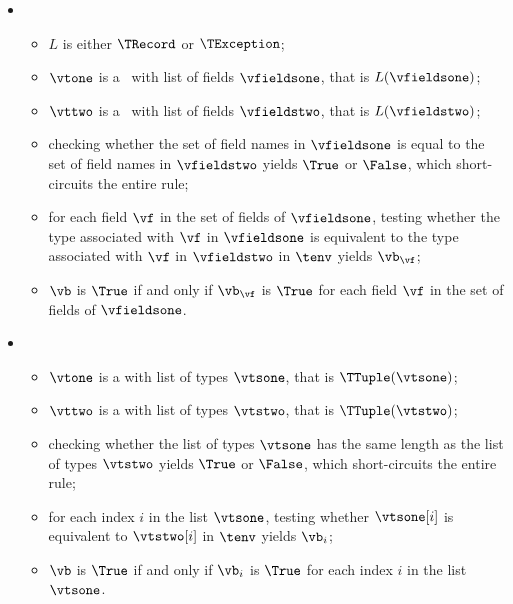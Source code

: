 \begin{itemize}
  \item {}
  \begin{itemize}
    \item $L$ is either $\TRecord$ or $\TException$;
    \item $\vtone$ is a \structuredtypeterm\ with list of fields $\vfieldsone$, that is $L(\vfieldsone)$;
    \item $\vttwo$ is a \structuredtypeterm\ with list of fields $\vfieldstwo$, that is $L(\vfieldstwo)$;
    \item checking whether the set of field names in $\vfieldsone$ is equal to the set of field names in $\vfieldstwo$
          yields $\True$ or $\False$, which short-circuits the entire rule;
    \item for each field $\vf$ in the set of fields of $\vfieldsone$, testing whether the type associated with
          $\vf$ in $\vfieldsone$ is equivalent to the type associated with
          $\vf$ in $\vfieldstwo$ in $\tenv$ yields $\vb_\vf$\ProseOrTypeError;
    \item $\vb$ is $\True$ if and only if $\vb_\vf$ is $\True$ for each field $\vf$ in the set of fields of $\vfieldsone$.
  \end{itemize}

  \item {}
  \begin{itemize}
    \item $\vtone$ is a \tupletypeterm{} with list of types $\vtsone$, that is $\TTuple(\vtsone)$;
    \item $\vttwo$ is a \tupletypeterm{} with list of types $\vtstwo$, that is $\TTuple(\vtstwo)$;
    \item checking whether the list of types $\vtsone$ has the same length as the list of types $\vtstwo$ yields $\True$
          or $\False$, which short-circuits the entire rule;
    \item for each index $i$ in the list $\vtsone$, testing whether $\vtsone[i]$ is equivalent to $\vtstwo[i]$ in $\tenv$
          yields $\vb_i$\ProseOrTypeError;
    \item $\vb$ is $\True$ if and only if $\vb_i$ is $\True$ for each index $i$ in the list $\vtsone$.
  \end{itemize}
\end{itemize}

\FormallyParagraph
\begin{mathpar}
\end{mathpar}

